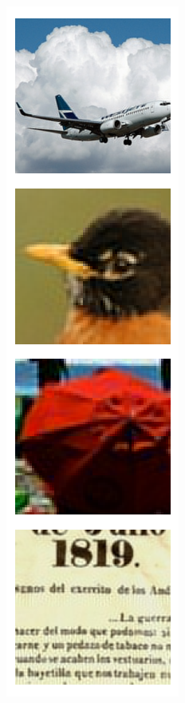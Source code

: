 \documentclass{article} %
\begin{document}
\begin{figure}[h]
\begin{subfigure}[t]{0.16\columnwidth}
\label{fig:manipulation-gaussian-latents}
\end{subfigure}
\begin{subfigure}[t]{0.16\columnwidth}
\includegraphics[width=1\columnwidth]{figures/latents/projection_zeros.png}\caption{}

\end{subfigure}
\end{figure}
\end{document}
